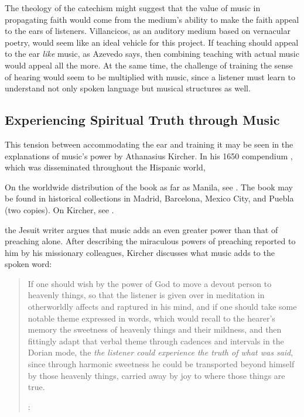 The theology of the catechism might suggest that the value of music in propagating faith would come from the medium's ability to make the faith appeal to the ears of listeners.
Villancicos, as an auditory medium based on vernacular poetry, would seem like an ideal vehicle for this project.
If teaching should appeal to the ear \emph{like} music, as Azevedo says, then combining teaching with actual music would appeal all the more.
At the same time, the challenge of training the sense of hearing would seem to be multiplied with music, since a listener must learn to understand not only spoken language but musical structures as well.

\subsection{Experiencing Spiritual Truth through Music}

This tension between accommodating the ear and training it may be seen in the explanations of music's power by Athanasius Kircher.
In his 1650 compendium , which was disseminated throughout the Hispanic world,%
\begin{Footnote}
  On the worldwide distribution of the book as far as Manila, see \autocite[\XXX]{Irving:Colonial}.
  The book may be found in historical collections in Madrid, Barcelona, Mexico City, and Puebla (two copies).
  On Kircher, see \XXX[cites].
\end{Footnote}
the Jesuit writer argues that music adds an even greater power than that of preaching alone.
After describing the miraculous powers of preaching reported to him by his missionary colleagues, Kircher discusses what music adds to the spoken word:
\begin{quote}
  If one should wish by the power of God to move a devout person to heavenly things, so that the listener is given over in meditation in otherworldly affects and raptured in his mind,
  and if one should take some notable theme expressed in words,
  which would recall to the hearer's memory the sweetness of heavenly things and their mildness,
  and then fittingly adapt that verbal theme through cadences and intervals in the Dorian mode,
  the \emph{the listener could experience the truth of what was said},
  since through harmonic sweetness he could be transported beyond himself by those heavenly things,
  carried away by joy to where those things are true.%
  \begin{Footnote}
    \Autocite[bk.~7, 550 (emphasis added)]{Kircher:Musurgia}:
  \end{Footnote}
\end{quote}

